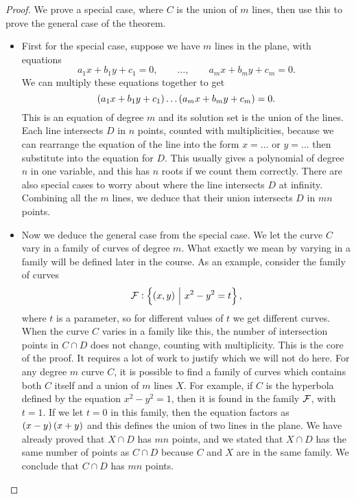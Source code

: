 \begin{proof}
We prove a special case, where $ C $ is the union of $ m $ lines, then use this to prove the general case of the theorem.
\begin{itemize}
\item First for the special case, suppose we have $ m $ lines in the plane, with equations
$$ a_1x + b_1y + c_1 = 0, \qquad \dots, \qquad a_mx + b_my + c_m = 0. $$
We can multiply these equations together to get
$$ \br{a_1x + b_1y + c_1} \dots \br{a_mx + b_my + c_m} = 0. $$
This is an equation of degree $ m $ and its solution set is the union of the lines. Each line intersects $ D $ in $ n $ points, counted with multiplicities, because we can rearrange the equation of the line into the form $ x = \dots $ or $ y = \dots $ then substitute into the equation for $ D $. This usually gives a polynomial of degree $ n $ in one variable, and this has $ n $ roots if we count them correctly. There are also special cases to worry about where the line intersects $ D $ at infinity. Combining all the $ m $ lines, we deduce that their union intersects $ D $ in $ mn $ points.
\item Now we deduce the general case from the special case. We let the curve $ C $ vary in a family of curves of degree $ m $. What exactly we mean by varying in a family will be defined later in the course. As an example, consider the family of curves
$$ \FFF : \cbr{\br{x, y} \st x^2 - y^2 = t}, $$
where $ t $ is a parameter, so for different values of $ t $ we get different curves. When the curve $ C $ varies in a family like this, the number of intersection points in $ C \cap D $ does not change, counting with multiplicity. This is the core of the proof. It requires a lot of work to justify which we will not do here. For any degree $ m $ curve $ C $, it is possible to find a family of curves which contains both $ C $ itself and a union of $ m $ lines $ X $. For example, if $ C $ is the hyperbola defined by the equation $ x^2 - y^2 = 1 $, then it is found in the family $ \mathcal{F} $, with $ t = 1 $. If we let $ t = 0 $ in this family, then the equation factors as $ \br{x - y}\br{x + y} $ and this defines the union of two lines in the plane. We have already proved that $ X \cap D $ has $ mn $ points, and we stated that $ X \cap D $ has the same number of points as $ C \cap D $ because $ C $ and $ X $ are in the same family. We conclude that $ C \cap D $ has $ mn $ points.
\end{itemize}
\end{proof}

